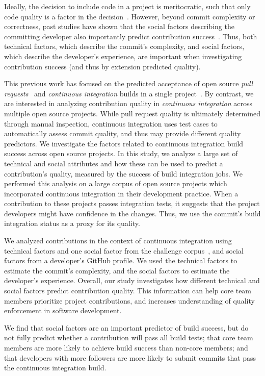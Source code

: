 \documentclass[10pt, conference]{IEEEtran}
\begin{document}
Ideally, the decision to include code in
a project is meritocratic, such that only code quality is a factor
in the decision~\cite{Scacchi07}.
However, beyond commit complexity or correctness, past
studies have shown that the social factors describing the committing developer also importantly
predict contribution success~\cite{tsay14icse, tsay14fse}.
Thus, both technical factors, which describe the commit's complexity, and
social factors, which describe the developer's experience, are important when
investigating contribution success (and thus by extension predicted quality).

This previous work has focused on the predicted acceptance of open source \emph{pull
requests}~\cite{tsay14icse, tsay14fse} and \emph{continuous integration} builds
in a single project~\cite{Hassan06,Kwan11,Wolf09}. 
By contrast,  we are interested in analyzing contribution quality 
in \emph{continuous integration} across multiple open source projects.  While 
pull request
quality is ultimately determined through manual inspection, continuous
integration uses test cases to automatically assess commit quality,
and thus may provide different quality predictors. 
We investigate the factors related to continuous integration build success
across open source projects.
In this study, we analyze a large set of technical and social attributes 
and how these can be used to predict a contribution's quality, measured by the
success of build integration jobs.
We performed this analysis on a large corpus of open source projects
which incorporated continuous integration in their development practice. 
When a contribution to these projects passes integration tests, 
it suggests that the project developers
might have confidence in the changes. 
Thus, we use the commit's build integration status as a proxy for its quality.

We analyzed contributions in the 
context of continuous integration using technical factors and one social
factor from the challenge
corpus~\cite{msr17challenge}, and social factors from a developer's
GitHub profile.  We used the technical factors to estimate the commit's
complexity, and the social factors to estimate the developer's experience.
Overall, our study investigates how different technical and social factors predict
contribution quality. This information can help core team members prioritize project
contributions, and increases understanding of quality enforcement
in software development.

We find that social factors are an important predictor of build success,
but do not fully predict whether a contribution will 
pass all build tests;
that core team members are more likely to achieve build success than non-core
members; and that developers with more followers are more likely to submit 
commits that pass the
continuous integration build.
\end{document}
